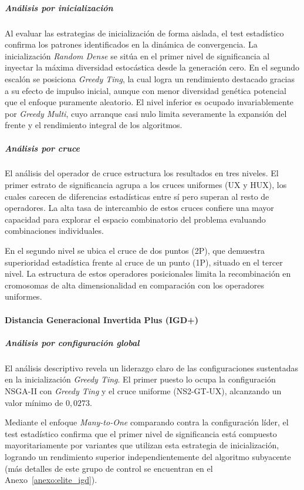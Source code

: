 \subparagraph{Análisis por inicialización}

Al evaluar las estrategias de inicialización de forma aislada, el test estadístico confirma los patrones identificados en la dinámica de convergencia. La inicialización \textit{Random Dense} se sitúa en el primer nivel de significancia al inyectar la máxima diversidad estocástica desde la generación cero. En el segundo escalón se posiciona \textit{Greedy Ting}, la cual logra un rendimiento destacado gracias a su efecto de impulso inicial, aunque con menor diversidad genética potencial que el enfoque puramente aleatorio. El nivel inferior es ocupado invariablemente por \textit{Greedy Multi}, cuyo arranque casi nulo limita severamente la expansión del frente y el rendimiento integral de los algoritmos.

\subparagraph{Análisis por cruce}

El análisis del operador de cruce estructura los resultados en tres niveles. El primer estrato de significancia agrupa a los cruces uniformes (UX y HUX), los cuales carecen de diferencias estadísticas entre sí pero superan al resto de operadores. La alta tasa de intercambio de estos cruces confiere una mayor capacidad para explorar el espacio combinatorio del problema evaluando combinaciones individuales. 

En el segundo nivel se ubica el cruce de dos puntos (2P), que demuestra superioridad estadística frente al cruce de un punto (1P), situado en el tercer nivel. La estructura de estos operadores posicionales limita la recombinación en cromosomas de alta dimensionalidad en comparación con los operadores uniformes.

\paragraph{Distancia Generacional Invertida Plus (IGD+)}

\subparagraph{Análisis por configuración global}

El análisis descriptivo revela un liderazgo claro de las configuraciones sustentadas en la inicialización \textit{Greedy Ting}. El primer puesto lo ocupa la configuración NSGA-II con \textit{Greedy Ting} y el cruce uniforme (NS2-GT-UX), alcanzando un valor mínimo de $0{,}0273$. 

Mediante el enfoque \textit{Many-to-One} comparando contra la configuración líder, el test estadístico confirma que el primer nivel de significancia está compuesto mayoritariamente por variantes que utilizan esta estrategia de inicialización, logrando un rendimiento superior independientemente del algoritmo subyacente (más detalles de este grupo de control se encuentran en el Anexo~\ref{anexo:elite_igd}).

